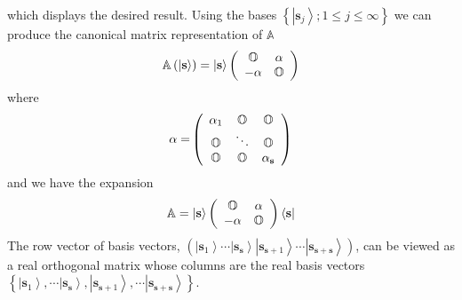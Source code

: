\documentclass[aps,preprint]{revtex4}%
\begin{document}
which displays the desired result. Using the bases $\left\{  \left\vert
\mathbf{s}_{j}\right\rangle ;1\leq j\leq\infty\right\}  $ we can produce the
canonical matrix representation of $\mathbb{A}$
\begin{equation}
\mathbb{A}\left(  \left\vert \mathbf{s}\right\rangle \right)  =\left\vert
\mathbf{s}\right\rangle \left(
\begin{array}
[c]{cc}%
\mathbb{O} & \mathbf{\alpha}\\
-\mathbf{\alpha} & \mathbb{O}%
\end{array}
\right)
\end{equation}
where
\begin{equation}
\mathbf{\alpha=}\left(
\begin{array}
[c]{ccc}%
\alpha_{1} & \mathbb{O} & \mathbb{O}\\
\mathbb{O} & \ddots & \mathbb{O}\\
\mathbb{O} & \mathbb{O} & \alpha_{\mathbf{s}}%
\end{array}
\right)
\end{equation}
and we have the expansion
\begin{equation}
\mathbb{A}=\left\vert \mathbf{s}\right\rangle \left(
\begin{array}
[c]{cc}%
\mathbb{O} & \mathbf{\alpha}\\
-\mathbf{\alpha} & \mathbb{O}%
\end{array}
\right)  \left\langle \mathbf{s}\right\vert \label{reex}%
\end{equation}
The row vector of basis vectors, $\left(  \left\vert \mathbf{s}_{1}%
\right\rangle \cdots\left\vert \mathbf{s}_{\mathbf{s}}\right\rangle \left\vert
\mathbf{s}_{\mathbf{s}+1}\right\rangle \cdots\left\vert \mathbf{s}%
_{\mathbf{s}+\mathbf{s}}\right\rangle \right)  $, can be viewed as a real
orthogonal matrix whose columns are the real basis vectors $\left\{
\left\vert \mathbf{s}_{1}\right\rangle ,\cdots\left\vert \mathbf{s}%
_{\mathbf{s}}\right\rangle ,\left\vert \mathbf{s}_{\mathbf{s}+1}\right\rangle
,\cdots\left\vert \mathbf{s}_{\mathbf{s}+\mathbf{s}}\right\rangle \right\}  $.
\end{document}
